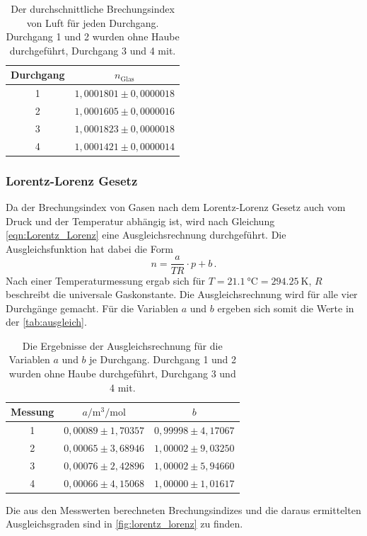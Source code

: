 \begin{table}[H]
  \centering
  \caption{Der durchschnittliche Brechungsindex von Luft für jeden Durchgang. Durchgang 1 und 2 wurden ohne Haube durchgeführt, Durchgang 3 und 4 mit.}
  \label{tab:n_luft_mean}
  \begin{tabular}{c c}
    \toprule
    Durchgang & $n_\text{Glas}$ \\
    \midrule
    1    &  $1,0001801 \pm 0,0000018$ \\   
    2    &  $1,0001605 \pm 0,0000016$ \\   
    3    &  $1,0001823 \pm 0,0000018$ \\   
    4    &  $1,0001421 \pm 0,0000014$ \\   
    \bottomrule
  \end{tabular}
\end{table}

\subsubsection{Lorentz-Lorenz Gesetz}
Da der Brechungsindex von Gasen nach dem Lorentz-Lorenz Gesetz auch vom Druck und  der Temperatur abhängig ist, wird nach Gleichung \eqref{eqn:Lorentz_Lorenz} eine Ausgleichsrechnung durchgeführt.
Die Ausgleichsfunktion hat dabei die Form
\begin{equation*}
  n = \frac{a}{TR} \cdot p + b \, .
\end{equation*}
Nach einer Temperaturmessung ergab sich für $T = \SI{21.1}{\celsius} = \SI{294.25}{\kelvin}$, $R$ beschreibt die universale Gaskonstante.
Die Ausgleichsrechnung wird für alle vier Durchgänge gemacht.
Für die Variablen $a$ und $b$ ergeben sich somit die Werte in der \autoref{tab:ausgleich}.
\begin{table}[H]
  \centering
  \caption{Die Ergebnisse der Ausgleichsrechnung für die Variablen $a$ und $b$ je Durchgang. Durchgang 1 und 2 wurden ohne Haube durchgeführt, Durchgang 3 und 4 mit.}
  \label{tab:ausgleich} 
  \begin{tabular}{c c c}
    \toprule
    Messung & $a / \si{\cubic\metre\per\mole}$ & $b$ \\
    \midrule
    1    &  $0,00089 \pm 1,70357$ & $0,99998 \pm 4,17067$ \\   
    2    &  $0,00065 \pm 3,68946$ & $1,00002 \pm 9,03250$ \\   
    3    &  $0,00076 \pm 2,42896$ & $1,00002 \pm 5,94660$ \\   
    4    &  $0,00066 \pm 4,15068$ & $1,00000 \pm 1,01617$ \\
    \bottomrule
  \end{tabular}
\end{table}
\noindent
Die aus den Messwerten berechneten Brechungsindizes und die daraus ermittelten Ausgleichsgraden sind in \autoref{fig:lorentz_lorenz} zu finden.

